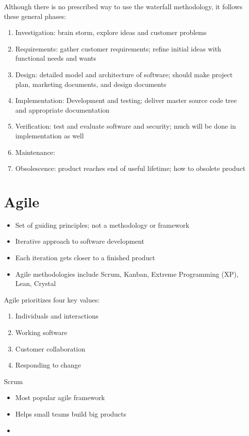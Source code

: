 \documentclass[12pt]{report}
\begin{document}
Although there is no prescribed way to use the waterfall methodology, it follows these general phases:
\begin{enumerate}
    \item Investigation: brain storm, explore ideas and customer problems
    \item Requirements: gather customer requirements; refine initial ideas with functional needs and wants
    \item Design: detailed model and architecture of software; should make project plan, marketing documents, and design documents
    \item Implementation: Development and testing; deliver master source code tree and appropriate documentation
    \item Verification: test and evaluate software and security; much will be done in implementation as well
    \item Maintenance:
    \item Obsolescence: product reaches end of useful lifetime; how to obsolete product
\end{enumerate}

\section{Agile}
\begin{itemize}
    \item Set of guiding principles; not a methodology or framework
    \item Iterative approach to software development
    \item Each iteration gets closer to a finished product
    \item Agile methodologies include Scrum, Kanban, Extreme Programming (XP), Lean, Crystal
\end{itemize}

Agile prioritizes four key values:
\begin{enumerate}
    \item Individuals and interactions
    \item Working software
    \item Customer collaboration
    \item Responding to change
\end{enumerate}

Scrum
\begin{itemize}
    \item Most popular agile framework
    \item Helps small teams build big products
    \item
\end{itemize}
\end{document}
